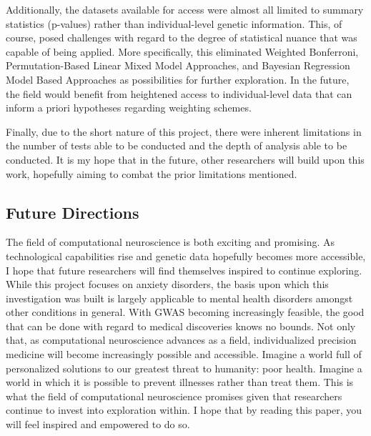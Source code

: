 \documentclass[12pt]{article}
\begin{document}
Additionally, the datasets available for access were almost all limited to summary statistics (p-values) rather than individual-level genetic information. This, of course, posed challenges with regard to the degree of statistical nuance that was capable of being applied. More specifically, this eliminated Weighted Bonferroni, Permutation-Based Linear Mixed Model Approaches, and Bayesian Regression Model Based Approaches as possibilities for further exploration. In the future, the field would benefit from heightened access to individual-level data that can inform a priori hypotheses regarding weighting schemes. \par

Finally, due to the short nature of this project, there were inherent limitations in the number of tests able to be conducted and the depth of analysis able to be conducted. It is my hope that in the future, other researchers will build upon this work, hopefully aiming to combat the prior limitations mentioned. \par

\subsection{Future Directions}
The field of computational neuroscience is both exciting and promising. As technological capabilities rise and genetic data hopefully becomes more accessible, I hope that future researchers will find themselves inspired to continue exploring. While this project focuses on anxiety disorders, the basis upon which this investigation was built is largely applicable to mental health disorders amongst other conditions in general. With GWAS becoming increasingly feasible, the good that can be done with regard to medical discoveries knows no bounds. Not only that, as computational neuroscience advances as a field, individualized precision medicine will become increasingly possible and accessible. Imagine a world full of personalized solutions to our greatest threat to humanity: poor health. Imagine a world in which it is possible to prevent illnesses rather than treat them. This is what the field of computational neuroscience promises given that researchers continue to invest into exploration within. I hope that by reading this paper, you will feel inspired and empowered to do so. \par

\newpage
\end{document}
